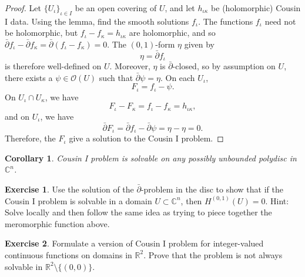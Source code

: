 \documentclass[12pt,openany]{book}
\newcommand{\C}{{\mathbb{C}}}
\newcommand{\R}{{\mathbb{R}}}
\newcommand{\sO}{{\mathscr{O}}}
\theoremstyle{plain}
\newtheorem{cor}[thm]{Corollary}
\theoremstyle{remark}
\theoremstyle{definition}
\newenvironment{exbox}{%
    \def\FrameCommand{\vrule width 1pt \relax\hspace{10pt}}%
    \MakeFramed{\advance\hsize-\width\FrameRestore}%
}{%
    \endMakeFramed
}
\theoremstyle{exercise}
\newtheorem{exercise}{Exercise}[section]
\theoremstyle{example}
\begin{document}
\begin{proof}
Let
$\{ U_{\iota} \}_{\iota \in I}$ be an open covering of $U$,
and let $h_{\iota\kappa}$ be (holomorphic) Cousin I
data.
Using the lemma, find the smooth solutions $f_\iota$.
The functions $f_\iota$ need not be holomorphic, but
$f_\iota-f_\kappa = h_{\iota\kappa}$ are holomorphic, and so
$\bar{\partial}f_\iota-\bar{\partial}f_\kappa = \bar{\partial}(f_\iota-f_\kappa) = 0$.  The $(0,1)$-form $\eta$ given by
\begin{equation*}
\eta = \bar{\partial}f_\iota
\end{equation*}
is therefore well-defined on $U$.  Moreover, $\eta$ is
$\bar{\partial}$-closed, so by assumption on $U$,
there exists a $\psi \in \sO(U)$ such that $\bar{\partial}\psi = \eta$.
On each $U_\iota$,
\begin{equation*}
F_\iota = f_\iota - \psi .
\end{equation*}
On $U_\iota \cap U_\kappa$, we have
\begin{equation*}
F_\iota - F_\kappa = f_\iota-f_\kappa = h_{\iota \kappa} ,
\end{equation*}
and on $U_\iota$, we have
\begin{equation*}
\bar{\partial}F_\iota = \bar{\partial}f_\iota - \bar{\partial}\psi =
\eta-\eta  = 0.
\end{equation*}
Therefore, the $F_{\iota}$ give a solution to the Cousin I problem.
\end{proof}

\begin{cor}
Cousin I problem is solvable on any possibly unbounded polydisc in $\C^n$.
\end{cor}

\begin{exbox}
\begin{exercise}
Use the solution of the $\bar{\partial}$-problem in the disc to show that
if the Cousin I problem is solvable in a domain $U \subset \C^n$, then
$H^{(0,1)}(U) = 0$.  Hint: Solve locally and then follow the same idea
as trying to piece together the meromorphic function above.
\end{exercise}

\begin{exercise}
Formulate a version of Cousin I problem for integer-valued continuous
functions on domains in $\R^2$.  Prove that the problem is
not always solvable in $\R^2 \setminus \{ (0,0) \}$.
\end{exercise}
\end{exbox}
\end{document}
